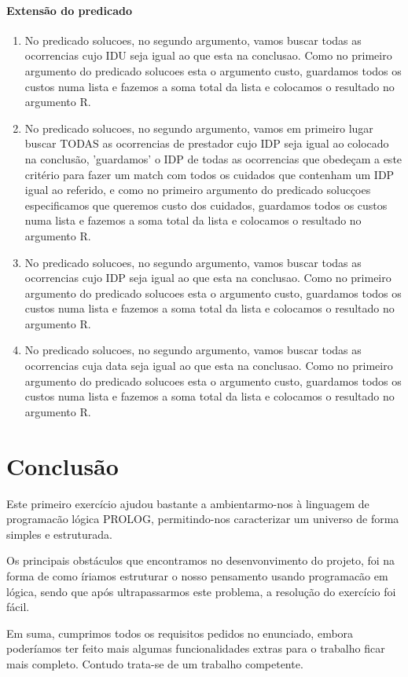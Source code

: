 \documentclass[a4paper]{report} %
\begin{document}
\subsubsection{Extensão do predicado}
\begin{enumerate}
\item No predicado solucoes, no segundo argumento, vamos buscar todas as ocorrencias cujo IDU seja igual ao que esta na conclusao. Como no primeiro argumento do predicado solucoes esta o argumento custo, guardamos todos os custos numa lista e fazemos a soma total da lista e colocamos o resultado no argumento R.
\item No predicado solucoes, no segundo argumento, vamos em primeiro lugar buscar TODAS as ocorrencias de prestador cujo IDP seja igual ao colocado na conclusão, 'guardamos' o IDP de todas as ocorrencias que obedeçam a este critério para fazer um match com todos os cuidados que contenham um IDP igual ao referido, e como no primeiro argumento do predicado solucçoes especificamos que queremos custo dos cuidados, guardamos todos os custos numa lista e fazemos a soma total da lista e colocamos o resultado no argumento R.
\item No predicado solucoes, no segundo argumento, vamos buscar todas as ocorrencias cujo IDP seja igual ao que esta na conclusao. Como no primeiro argumento do predicado solucoes esta o argumento custo, guardamos todos os custos numa lista e fazemos a soma total da lista e colocamos o resultado no argumento R.
\item No predicado solucoes, no segundo argumento, vamos buscar todas as ocorrencias cuja data seja igual ao que esta na conclusao. Como no primeiro argumento do predicado solucoes esta o argumento custo, guardamos todos os custos numa lista e fazemos a soma total da lista e colocamos o resultado no argumento R.
\end{enumerate}

\chapter{Conclusão}
Este primeiro exercício ajudou bastante a ambientarmo-nos à linguagem de programacão lógica PROLOG, permitindo-nos caracterizar um universo de forma simples e estruturada.\par
Os principais obstáculos que encontramos no desenvonvimento do projeto, foi na forma de como íriamos estruturar o nosso pensamento usando programacão em lógica, sendo que após ultrapassarmos este problema, a resolução do exercício foi fácil.\par
Em suma, cumprimos todos os requisitos pedidos no enunciado, embora poderíamos ter feito mais algumas funcionalidades extras para o trabalho ficar mais completo. Contudo trata-se de um trabalho competente.
\end{document}
